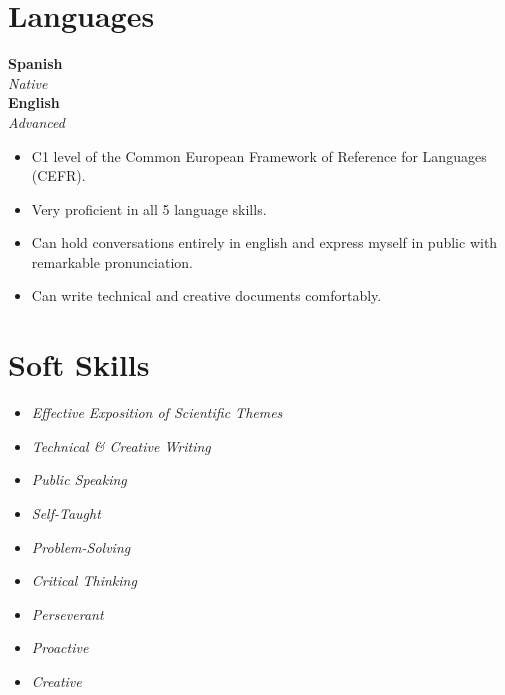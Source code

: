 \documentclass[10pt]{article}
\begin{document}
\begin{multicols}{2}
	\section*{\Large{Languages} \hrulefill}
	
	\noindent
	\textbf{Spanish} \\
	\textit{Native} \\
	
	\noindent
	\textbf{English} \\
	\textit{Advanced}

	\vspace{2em}

	\noindent
	\begin{minipage}{3in}
		\begin{itemize}
			\item C1 level of the Common European Framework of Reference for
				Languages (CEFR).
			\item Very proficient in all 5 language skills.
			\item Can hold conversations entirely in english and express myself
				in public with remarkable pronunciation.
			\item Can write technical and creative documents comfortably.
		\end{itemize}
	\end{minipage}

	\vspace{2em}

	\section*{\Large{Soft Skills} \hrulefill}
	\begin{itemize}
		\item \textit{Effective Exposition of Scientific Themes}
		\item \textit{Technical \& Creative Writing}
		\item \textit{Public Speaking}
		\item \textit{Self-Taught}
		\item \textit{Problem-Solving}
		\item \textit{Critical Thinking}
		\item \textit{Perseverant}
		\item \textit{Proactive}
		\item \textit{Creative}
	\end{itemize}


\end{multicols}
\end{document}
